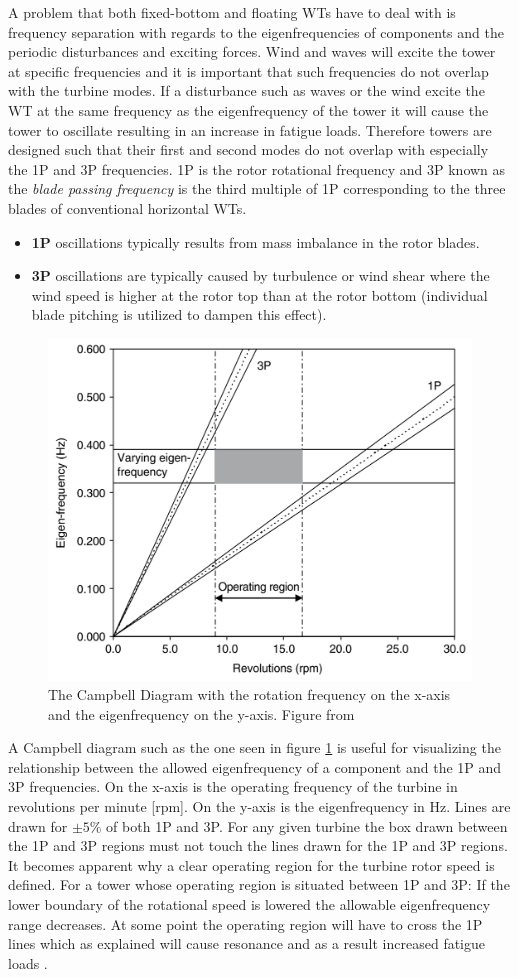 A problem that both fixed-bottom and floating WTs have to deal with is frequency separation with regards to the eigenfrequencies of components and the periodic disturbances and exciting forces. Wind and waves will excite the tower at specific frequencies and it is important that such frequencies do not overlap with the turbine modes. If a disturbance such as waves or the wind excite the WT at the same frequency as the eigenfrequency of the tower it will cause the tower to oscillate resulting in an increase in fatigue loads. Therefore towers are designed such that their first and second modes do not overlap with especially the 1P and 3P frequencies. 1P is the rotor rotational frequency and 3P known as the \textit{blade passing frequency} is the third multiple of 1P corresponding to the three blades of conventional horizontal WTs.
\begin{itemize}
	\item \textbf{1P} oscillations typically results from mass imbalance in the rotor blades.
	\item \textbf{3P} oscillations are typically caused by turbulence or wind shear where the wind speed is higher at the rotor top than at the rotor bottom (individual blade pitching is utilized to dampen this effect).
\end{itemize}
\begin{figure}[ht]
	\centering
	\includegraphics[width=0.5\linewidth]{Graphics/CampbellDiagram.PNG}
	\caption{The Campbell Diagram with the rotation frequency on the x-axis and the eigenfrequency on the y-axis. Figure from \cite{Valentine2015}}
	\label{fig:campbell}
\end{figure}
A Campbell diagram such as the one seen in figure \cref{fig:campbell} is useful for visualizing the relationship between the allowed eigenfrequency of a component and the 1P and 3P frequencies. On the x-axis is the operating frequency of the turbine in revolutions per minute [rpm]. On the y-axis is the eigenfrequency in Hz. Lines are drawn for $ \pm 5 \% $ of both 1P and 3P. For any given turbine the box drawn between the 1P and 3P regions must not touch the lines drawn for the 1P and 3P regions. It becomes apparent why a clear operating region for the turbine rotor speed is defined. For a tower whose operating region is situated between 1P and 3P: If the lower boundary of the rotational speed is lowered the allowable eigenfrequency range decreases. At some point the operating region will have to cross the 1P lines which as explained will cause resonance and as a result increased fatigue loads \cite{Valentine2015}.

